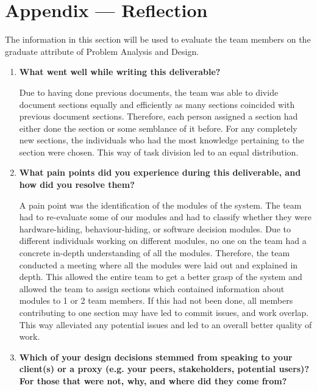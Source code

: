 \documentclass[12pt, titlepage]{article}
\begin{document}
\section*{Appendix --- Reflection}


The information in this section will be used to evaluate the team members on the
graduate attribute of Problem Analysis and Design.

%

\begin{enumerate}
  \item \textbf{What went well while writing this deliverable?} 
  
  Due to having done previous documents, the team was able to divide document sections equally and efficiently as many sections coincided with previous document sections. Therefore, each person assigned a section had either done the section or some semblance of it before. For any completely new sections, the individuals who had the most knowledge pertaining to the section were chosen. This way of task division led to an equal distribution.

  \item \textbf{What pain points did you experience during this deliverable, and how did you resolve them?}

  A pain point was the identification of the modules of the system. The team had to re-evaluate some of our modules and had to classify whether they were hardware-hiding, behaviour-hiding, or software decision modules.  Due to different individuals working on different modules, no one on the team had a concrete in-depth understanding of all the modules. Therefore, the team conducted a meeting where all the modules were laid out and explained in depth. This allowed the entire team to get a better grasp of the system and allowed the team to assign sections which contained information about modules to 1 or 2 team members. If this had not been done, all members contributing to one section may have led to commit issues, and work overlap.  This way alleviated any potential issues and led to an overall better quality of work.

  \item \textbf{Which of your design decisions stemmed from speaking to your client(s)
  or a proxy (e.g. your peers, stakeholders, potential users)? For those that
  were not, why, and where did they come from?}
  

\end{enumerate}
\end{document}
